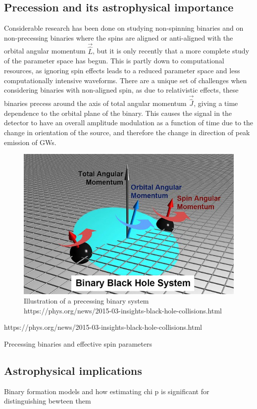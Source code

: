 \documentclass[]{article}
\begin{document}
\subsection{Precession and its astrophysical importance}
Considerable research has been done on studying non-spinning binaries and on non-precessing binaries where the spins are aligned or anti-aligned with the orbital angular momentum $\vec{\hat{L}}$\cite{pe3}, but it is only recently that a more complete study of the parameter space has begun\cite{pe_latest}. This is partly down to computational resources, as ignoring spin effects leads to a reduced parameter space and less computationally intensive waveforms. There are a unique set of challenges when considering binaries with non-aligned spin, as due to relativistic effects, these binaries precess around the axis of total angular momentum $\vec{\hat{J}}$, giving a time dependence to the orbital plane of the binary\cite{precess1}\cite{precess2}. This causes the signal in the detector to have an overall amplitude modulation as a function of time due to the change in orientation of the source, and therefore the change in direction of peak emission of GWs.
\begin{figure}[h]
	\includegraphics[scale=0.75]{fig6.jpg}
	\centering
	\caption{Illustration of a precessing binary system https://phys.org/news/2015-03-insights-black-hole-collisions.html}
	\centering
\end{figure}


https://phys.org/news/2015-03-insights-black-hole-collisions.html

Precessing binaries and effective spin parameters\cite{sloos}
\subsection{Astrophysical implications}
Binary formation models and how estimating chi p is significant for distinguishing bewteen them
\end{document}

